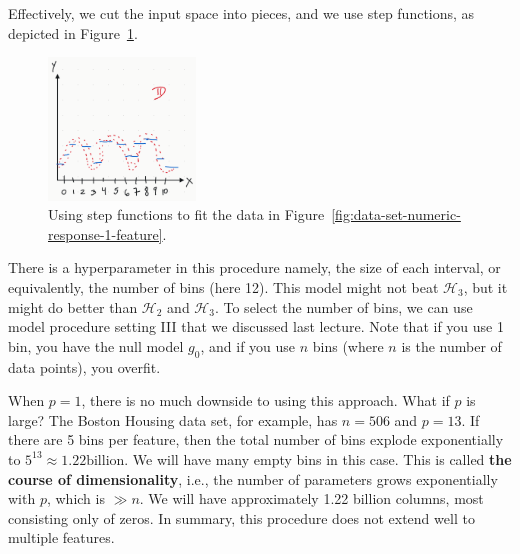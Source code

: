 \documentclass[12pt, a4paper]{article}
\theoremstyle{definition}
\begin{document}
	Effectively, we cut the input space into pieces, and we use step functions,
	as depicted in Figure~\ref{fig:data-set-numeric-response-1-feature-step}.
	\begin{figure}
		\centering
		\includegraphics[width=0.35\textwidth]{data-set-numeric-response-1-feature-step}
		\caption{Using step functions to fit the data in
		Figure~\ref{fig:data-set-numeric-response-1-feature}.}
		\label{fig:data-set-numeric-response-1-feature-step}
	\end{figure}
	There is a hyperparameter in this procedure namely, the size of each interval,
	or equivalently, the number of bins (here 12). This model might not beat
	$\mathcal{H}_3$, but it might do better than $\mathcal{H}_2$ and $\mathcal{H}_3$.
	To select the number of bins, we can use model procedure setting III that we discussed
	last lecture. Note that if you use 1 bin, you have the null model $g_0$,
	and if you use $n$ bins (where $n$ is the number of data points), you overfit.
	
	When $p = 1$, there is no much downside to using this approach. What if $p$ is large?
	The Boston Housing data set, for example, has $n = 506$ and $p = 13$. If there
	are 5 bins per feature, then the total number of bins explode exponentially
	to $5^{13}\approx 1.22 \text{billion}$. We will have many empty bins in this
	case. This is called \textbf{the course of dimensionality}, i.e., the number
	of parameters grows exponentially with $p$, which is $\gg n$. We will have
	approximately 1.22 billion columns, most consisting only of zeros. In summary,
	this procedure does not extend well to multiple features.
	
\end{document}

